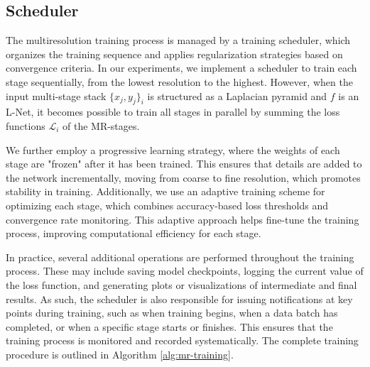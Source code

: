 


\subsection{Scheduler}


The multiresolution training process is managed by a training scheduler, which organizes the training sequence and applies regularization strategies based on convergence criteria. In our experiments, we implement a scheduler to train each stage sequentially, from the lowest resolution to the highest. However, when the input multi-stage stack $\{x_j, y_j\}_i$ is structured as a Laplacian pyramid and $f$ is an L-Net, it becomes possible to train all stages in parallel by summing the loss functions $\mathcal{L}_i$ of the MR-stages.


We further employ a progressive learning strategy, where the weights of each stage are "frozen" after it has been trained. This ensures that details are added to the network incrementally, moving from coarse to fine resolution, which promotes stability in training. Additionally, we use an adaptive training scheme for optimizing each stage, which combines accuracy-based loss thresholds and convergence rate monitoring. This adaptive approach helps fine-tune the training process, improving computational efficiency for each stage.

In practice, several additional operations are performed throughout the training process. These may include saving model checkpoints, logging the current value of the loss function, and generating plots or visualizations of intermediate and final results. As such, the scheduler is also responsible for issuing notifications at key points during training, such as when training begins, when a data batch has completed, or when a specific stage starts or finishes. This ensures that the training process is monitored and recorded systematically. The complete training procedure is outlined in Algorithm \ref{alg:mr-training}.

